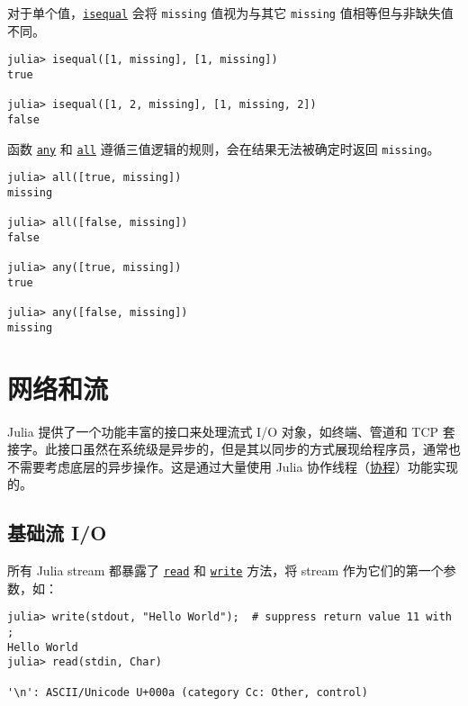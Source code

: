 对于单个值，\hyperlink{269533589463185031}{\texttt{isequal}} 会将 \texttt{missing} 值视为与其它 \texttt{missing} 值相等但与非缺失值不同。




\begin{verbatim}
julia> isequal([1, missing], [1, missing])
true

julia> isequal([1, 2, missing], [1, missing, 2])
false
\end{verbatim}



函数 \hyperlink{14612039032155203548}{\texttt{any}} 和 \hyperlink{7942004983516218646}{\texttt{all}} 遵循三值逻辑的规则，会在结果无法被确定时返回 \texttt{missing}。




\begin{verbatim}
julia> all([true, missing])
missing

julia> all([false, missing])
false

julia> any([true, missing])
true

julia> any([false, missing])
missing
\end{verbatim}



\hypertarget{15469988008975030780}{}


\chapter{网络和流}



Julia 提供了一个功能丰富的接口来处理流式 I/O 对象，如终端、管道和 TCP 套接字。此接口虽然在系统级是异步的，但是其以同步的方式展现给程序员，通常也不需要考虑底层的异步操作。这是通过大量使用 Julia 协作线程（\hyperlink{17473131347184639576}{协程}）功能实现的。



\hypertarget{16725310763095786332}{}


\section{基础流 I/O}



所有 Julia stream 都暴露了 \hyperlink{8104134490906192097}{\texttt{read}} 和 \hyperlink{16947913578760238729}{\texttt{write}} 方法，将 stream 作为它们的第一个参数，如：




\begin{verbatim}
julia> write(stdout, "Hello World");  # suppress return value 11 with ;
Hello World
julia> read(stdin, Char)

'\n': ASCII/Unicode U+000a (category Cc: Other, control)
\end{verbatim}



